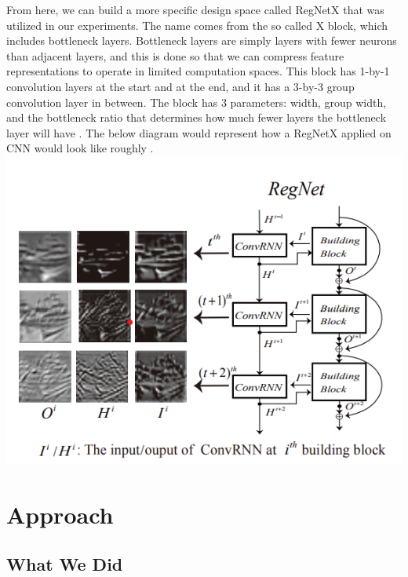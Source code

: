 \documentclass[10pt,twocolumn,letterpaper]{article}
\begin{document}
From here, we can build a more specific design space called RegNetX that was utilized in our experiments. The name comes from the so called X block, which includes bottleneck layers. Bottleneck layers are simply layers with fewer neurons than adjacent layers, and this is done so that we can compress feature representations to operate in limited computation spaces. This block has 1-by-1 convolution layers at the start and at the end, and it has a 3-by-3 group convolution layer in between. The block has 3 parameters: width, group width, and the bottleneck ratio that determines how much fewer layers the bottleneck layer will have \cite{NetworkDesignSpace}. The below diagram would represent how a RegNetX applied on CNN would look like roughly \cite{RegNetPic}. 
\includegraphics[width=1\linewidth]{docs/latex/images/eric/regnetstruct.png}

\section{Approach}

\subsection{What We Did}
\end{document}
